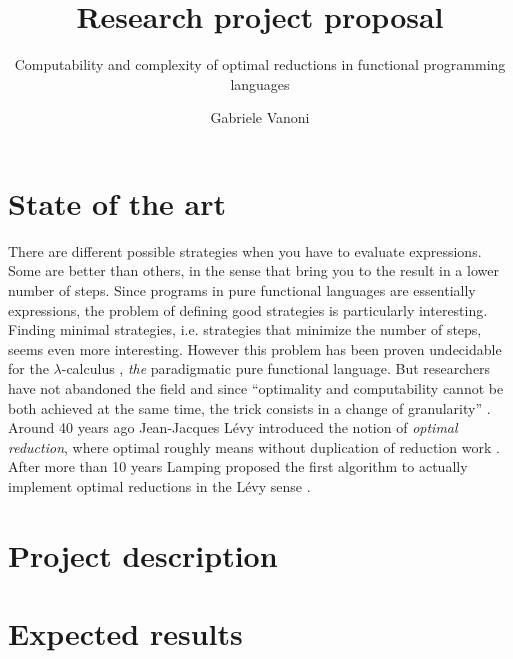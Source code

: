 \documentclass[english]{scrartcl}
\begin{document}
\title{Research project proposal}
\subtitle{Computability and complexity of optimal reductions in functional programming languages}
\author{Gabriele Vanoni}
\date{}
\maketitle
\section{State of the art}
There are different possible strategies when you have to evaluate expressions. Some are better than others, in the sense that bring you to the result in a lower number of steps. Since programs in pure functional languages are essentially expressions, the problem of defining good strategies is particularly interesting. Finding minimal strategies, i.e. strategies that minimize the number of steps, seems even more interesting. However this problem has been proven undecidable for the $\lambda$-calculus \cite[Section~13.5]{barendregt_lambda_1984}, \emph{the} paradigmatic pure functional language. But researchers have not abandoned the field and since ``optimality and computability cannot be both achieved at the same time, the trick consists in a change of granularity'' \cite{terese_term_2003}. Around 40 years ago Jean-Jacques Lévy introduced the notion of \emph{optimal reduction}, where optimal roughly means without duplication of reduction work \cite{levy_reductions_1978}. After more than 10 years Lamping proposed the first algorithm to actually implement optimal reductions in the Lévy sense  \cite{lamping_algorithm_1990}.
\section{Project description}
\section{Expected results}


\end{document}
